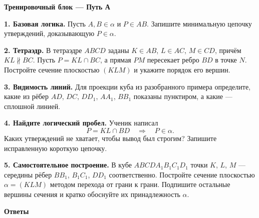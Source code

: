 \documentclass[a4paper,12pt]{article}
\newcommand{\sectitle}[1]{%
  \vspace{0.55em}%
  {\Large\bfseries\color{darkaccent}#1\par}%
  \vspace{0.2em}%
  \noindent{\color{accent}\rule{\linewidth}{0.8pt}}%
  \vspace{0.45em}%
}
\begin{document}
\endgroup

\clearpage

\sectitle{Тренировочный блок --- Путь А}

\begingroup
{}

\textbf{1. Базовая логика.}
Пусть $A,B\in\alpha$ и $P\in AB$. Запишите минимальную цепочку утверждений, доказывающую $P\in\alpha$.

\vspace{0.45em}

\textbf{2. Тетраэдр.}
В тетраэдре $ABCD$ заданы
$K\in AB$, $L\in AC$, $M\in CD$, причём $KL\not\parallel BC$.
Пусть $P=KL\cap BC$, а прямая $PM$ пересекает ребро $BD$ в точке $N$.
Постройте сечение плоскостью $(KLM)$ и укажите порядок его вершин.

\vspace{0.45em}

\textbf{3. Видимость линий.}
Для проекции куба из разобранного примера определите, какие из рёбер
$AD$, $DC$, $DD_1$, $AA_1$, $BB_1$ показаны пунктиром, а какие --- сплошной линией.

\vspace{0.45em}

\textbf{4. Найдите логический пробел.}
Ученик написал
\[
P=KL\cap BD
\quad\Longrightarrow\quad
P\in\alpha.
\]
Каких утверждений не хватает, чтобы вывод был строгим? Запишите исправленную короткую цепочку.

\vspace{0.45em}

\textbf{5. Самостоятельное построение.}
В кубе $ABCDA_1B_1C_1D_1$ точки $K$, $L$, $M$ --- середины рёбер
$BB_1$, $B_1C_1$, $DD_1$ соответственно.
Постройте сечение плоскостью $\alpha=(KLM)$ методом перехода от грани к грани.
Подпишите остальные вершины сечения и кратко обоснуйте их принадлежность $\alpha$.

\endgroup

\clearpage

\sectitle{Ответы}

\renewcommand{\arraystretch}{1.45}
\end{document}
